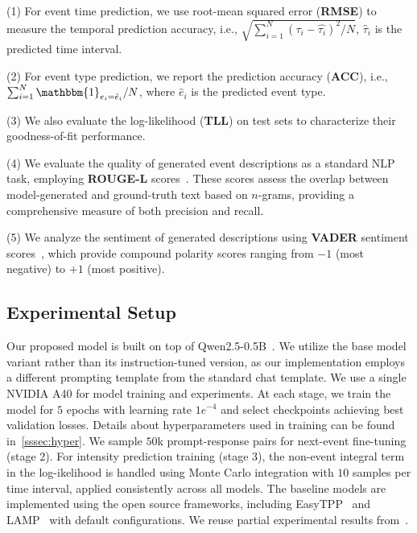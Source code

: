 (1) For event time prediction, we use root-mean squared error (\textbf{RMSE}) to measure the temporal prediction accuracy, i.e., $\sqrt{\sum_{i=1}^N(\tau_i - \hat{\tau_i})^2/N}$, $\hat{\tau}_i$ is the predicted time interval. 

(2) For event type prediction, we report the prediction accuracy (\textbf{ACC}), i.e., $\sum_{i=1}^N \mathbbm{1}_{e_i=\hat{e}_i}/N$, where $\hat{e}_i$ is the predicted event type. 

(3) We also evaluate the log-likelihood (\textbf{TLL}) on test sets to characterize their goodness-of-fit performance. 

(4) We evaluate the quality of generated event descriptions as a standard NLP task, employing \textbf{ROUGE-L} scores~\citep{lin2004rouge}. These scores assess the overlap between model-generated and ground-truth text based on $n$-grams, providing a comprehensive measure of both precision and recall. 

(5) We analyze the sentiment of generated descriptions using \textbf{VADER} sentiment scores~\citep{hutto2014vader}, which provide compound polarity scores ranging from $-1$ (most negative) to $+1$ (most positive).






\subsection{Experimental Setup}
Our proposed model is built on top of Qwen2.5-0.5B~\citep{yang2024qwen25}.
We utilize the base model variant rather than its instruction-tuned version, as our implementation employs a different prompting template from the standard chat template. We use a single NVIDIA A40 for model training and experiments. At each stage, we train the model for $5$ epochs with learning rate $1e^{-4}$ and select checkpoints achieving best validation losses. Details about hyperparameters used in training can be found in~\cref{sssec:hyper}. We sample $50$k prompt-response pairs for next-event fine-tuning (stage 2). For intensity prediction training (stage 3), the non-event integral term in the log-ikelihood is handled using Monte Carlo integration with $10$ samples per time interval, applied consistently across all models. 
The baseline models are implemented using the open source frameworks, including EasyTPP~\citep{xue2023easytpp} and LAMP~\citep{shi2024language} with default configurations. We reuse partial experimental results from~\citep{xue2023easytpp,shi2024language}. 



